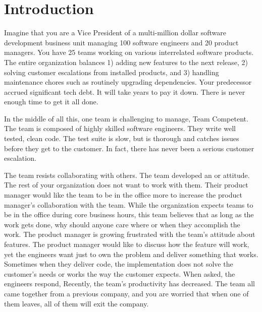 




\chapter{Introduction}
\label{IntroductionChapter}


Imagine that you are a Vice President of a multi-million dollar software development business unit managing 100 software engineers and 20 product managers. You have 25 teams working on various interrelated software products. The entire organization balances 1) adding new features to the next release, 2) solving customer escalations from installed products, and 3) handling maintenance chores such as routinely upgrading dependencies. Your predecessor accrued significant tech debt. It will take years to pay it down. There is never enough time to get it all done. 


In the middle of all this, one team is challenging to manage, Team Competent. The team is composed of highly skilled software engineers. They write well tested, clean code. The test suite is slow, but is thorough and catches issues before they get to the customer. In fact, there has never been a serious customer escalation.


The team resists collaborating with others. The team developed an  or  attitude. The rest of your organization does not want to work with them. Their product manager would like the team to be in the office more to increase the product manager’s collaboration with the team. While the organization expects teams to be in the office during core business hours, this team believes that as long as the work gets done, why should anyone care where or when they accomplish the work. The product manager is growing frustrated with the team’s attitude about features. The product manager would like to discuss how the feature will work, yet the engineers want just to own the problem and deliver something that works. Sometimes when they deliver code, the implementation does not solve the customer’s needs or works the way the customer expects. When asked,  the engineers respond,  Recently, the team’s productivity has decreased. The team all came together from a previous company, and you are worried that when one of them leaves, all of them will exit the company.


